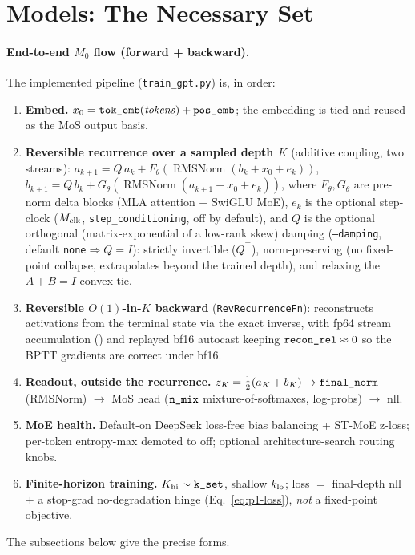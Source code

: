 \documentclass[11pt]{article}
\newcommand{\RMSNorm}{\operatorname{RMSNorm}}
\newcommand{\code}[1]{\texttt{#1}}
\begin{document}
\section{Models: The Necessary Set}
\label{sec:models}

\paragraph{End-to-end \(M_0\) flow (forward + backward).}
The implemented pipeline (\code{train\_gpt.py}) is, in order:
\begin{enumerate}[leftmargin=1.6em,itemsep=1pt]
  \item \textbf{Embed.}  \(x_0=\code{\detokenize{tok_emb}}(\mathit{tokens})+\code{\detokenize{pos_emb}}\);
  the embedding is tied and reused as the MoS output basis.
  \item \textbf{Reversible recurrence over a sampled depth \(K\)} (additive coupling, two streams):
  \(a_{k+1}=Q\,a_k+F_\theta(\RMSNorm(b_k+x_0+e_k))\),
  \(b_{k+1}=Q\,b_k+G_\theta(\RMSNorm(a_{k+1}+x_0+e_k))\), where \(F_\theta,G_\theta\) are pre-norm delta
  blocks (MLA attention + SwiGLU MoE), \(e_k\) is the optional step-clock (\(M_{\rm clk}\),
  \code{step\_conditioning}, off by default), and \(Q\) is the optional orthogonal (matrix-exponential
  of a low-rank skew) damping (\code{--damping}, default \code{none}\(\Rightarrow Q{=}I\)): strictly
  invertible (\(Q^{\top}\)), norm-preserving (no fixed-point collapse, extrapolates beyond the trained
  depth), and relaxing the \(A{+}B{=}I\) convex tie.
  \item \textbf{Reversible \(O(1)\)-in-\(K\) backward} (\code{RevRecurrenceFn}): reconstructs activations
  from the terminal state via the exact inverse, with fp64 stream accumulation
  (\code{}) and replayed bf16 autocast keeping
  \(\code{\detokenize{recon_rel}}\approx0\) so the BPTT gradients are correct under bf16.
  \item \textbf{Readout, outside the recurrence.}  \(z_K=\tfrac12(a_K+b_K)\to\code{\detokenize{final_norm}}\)
  (RMSNorm) \(\to\) MoS head (\(\code{\detokenize{n_mix}}\) mixture-of-softmaxes, log-probs) \(\to\) nll.
  \item \textbf{MoE health.}  Default-on DeepSeek loss-free bias balancing + ST-MoE z-loss; per-token
  entropy-max demoted to off; optional architecture-search routing knobs.
  \item \textbf{Finite-horizon training.}  \(K_{\rm hi}\sim\code{\detokenize{k_set}}\), shallow
  \(k_{\rm lo}\); loss \(=\) final-depth nll \(+\) a stop-grad no-degradation hinge (Eq.~\eqref{eq:p1-loss}),
  \emph{not} a fixed-point objective.
\end{enumerate}
The subsections below give the precise forms.
\end{document}
